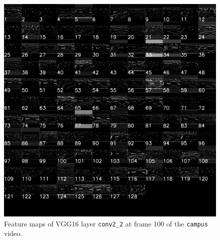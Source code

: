 \documentclass[hidelinks]{article}
\begin{document}
\begin{figure}[H]
  \centering
  \includegraphics[scale=0.30]{acts_conv2_2}
  \caption{Feature maps of VGG16 layer \texttt{conv2\_2} at frame 100 of the \texttt{campus} video.}
  \label{fig:acts_conv2_2}
\end{figure}
\end{document}
